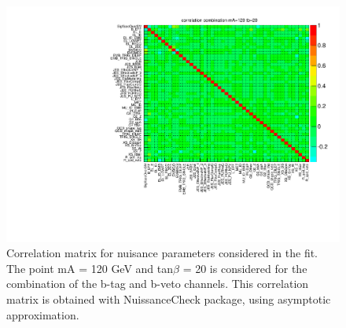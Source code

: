 \begin{figure}[htp]
     \begin{center}

           \includegraphics[width=1.1\textwidth]{figure/np_check/matrix_comb_120.pdf}
    \end{center}
    \caption{ Correlation matrix for nuisance parameters considered in the fit.  The point mA = 120 GeV and tan$\beta$ = 20 is 
	considered for the combination of the b-tag and b-veto channels. This correlation matrix is obtained with 
	NuissanceCheck package, using asymptotic approximation.} 
    \label{fig:np_correlation_comb}
\end{figure}



